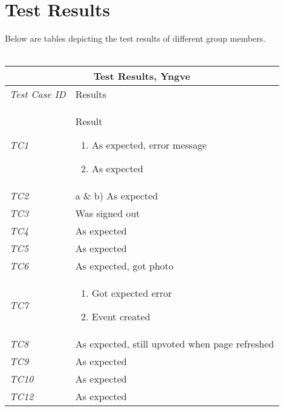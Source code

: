 \section{Test Results}
\label{sec:TestingResults}
%
Below are tables depicting the test results of different group members. \\ \\
%
\begin{minipage}{\linewidth}
\setlength{\tabcolsep}{15pt}
\centering
{}
\begin{tabular}{ |l|p{70mm}| }
	\hline
	\multicolumn{2}{|c|}{\cellcolor{gray!25} \textbf{Test Results, Yngve}} \\
	\hline
	\it{\cellcolor{gray!25}Test Case ID} & {\cellcolor{gray!25} Results } \\
	\hline
	\it{\cellcolor{gray!25}TC1} & Result \begin{enumerate}[label=\alph*)]
	                                       \item As expected, error message
	                                       \item As expected
	                                     \end{enumerate}\\ \hline
	\it{\cellcolor{gray!25}TC2}  & a \& b) As expected \\ \hline
	\it{\cellcolor{gray!25}TC3} & Was signed out \\ \hline
	\it{\cellcolor{gray!25}TC4} & As expected \\ \hline
	\it{\cellcolor{gray!25}TC5} & As expected \\ \hline
	\it{\cellcolor{gray!25}TC6} & As expected, got photo \\ \hline
	\it{\cellcolor{gray!25}TC7} & \begin{enumerate}[label=\alph*)]
	                                \item Got expected error
	                                \item Event created
                                  \end{enumerate}\\ \hline
	\it{\cellcolor{gray!25}TC8} & As expected, still upvoted when page refreshed \\ \hline
	\it{\cellcolor{gray!25}TC9} & As expected \\ \hline
	\it{\cellcolor{gray!25}TC10} & As expected \\ \hline
	\it{\cellcolor{gray!25}TC12} & As expected \\ \hline

\end{tabular}
\end{minipage}
